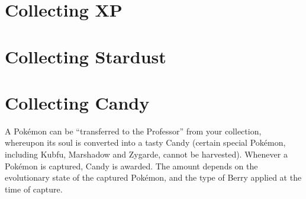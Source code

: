 \section{Collecting XP}

\section{Collecting Stardust}

\section{Collecting Candy}
A Pokémon can be ``transferred to the Professor'' from your collection,
 whereupon its soul is converted into a tasty Candy (certain special
 Pokémon, including Kubfu, Marshadow and Zygarde, cannot be harvested).
Whenever a Pokémon is captured, Candy is awarded. The amount depends on
 the evolutionary state of the captured Pokémon, and the type of Berry
 applied at the time of capture.
